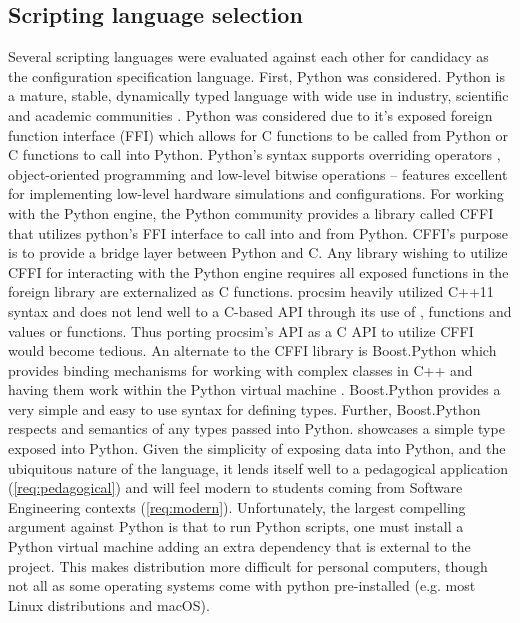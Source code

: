 \subsection{Scripting language selection}

Several scripting languages were evaluated against each other for candidacy as the configuration specification language. First, Python \cite{Python:Homepage} was considered. Python is a mature, stable, dynamically typed language with wide use in industry, scientific and academic communities \cite{StackOverflowSurvey2016}. Python was considered due to it's exposed foreign function interface (FFI) which allows for C functions to be called from Python or C functions to call into Python. Python's syntax supports overriding operators \cite{Python:Operators}, object-oriented programming \cite{Python:Classes} and low-level bitwise operations \cite{Python:BuiltinTypes} -- features excellent for implementing low-level hardware simulations and configurations. For working with the Python engine, the Python community provides a library called CFFI that utilizes python's FFI interface to call into and from Python. CFFI's purpose is to provide a bridge layer between Python and C. Any library wishing to utilize CFFI for interacting with the Python engine requires all exposed functions in the foreign library are externalized as C functions. procsim heavily utilized C++11 syntax and does not lend well to a C-based API through its use of ,  functions and  values or functions. Thus porting procsim's API as a C API to utilize CFFI would become tedious. An alternate to the CFFI library is Boost.Python which provides binding mechanisms for working with complex classes in C++ and having them work within the Python virtual machine \cite{Boost1.53.0:Python}. Boost.Python provides a very simple and easy to use syntax for defining types. Further, Boost.Python respects  and  semantics of any types passed into Python.  showcases a simple type exposed into Python. Given the simplicity of exposing data into Python, and the ubiquitous nature of the language, it lends itself well to a pedagogical application (\cref{req:pedagogical}) and will feel modern to students coming from Software Engineering contexts (\cref{req:modern}). Unfortunately, the largest compelling argument against Python is that to run Python scripts, one must install a Python virtual machine adding an extra dependency that is external to the project. This makes distribution more difficult for personal computers, though not all as some operating systems come with python pre-installed (e.g. most Linux distributions and macOS).

